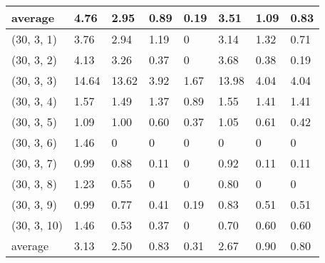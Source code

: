 \begin{appendices}
\begin{table}[H]
\begin{tabular}{  p{1.6cm} | p{0.8cm} | p{1cm} p{1cm} p{1cm} | p{1cm} p{1cm} p{1cm} }
\midrule
average & 4.76  & 2.95 & 0.89  &0.19  &  3.51 & 1.09  & 0.83 \\
\bottomrule
(30, 3, 1) & 3.76  & 2.94  &  1.19 & 0 & 3.14  & 1.32  & 0.71  \\
(30, 3, 2) & 4.13  &  3.26 & 0.37  & 0 &  3.68 & 0.38  & 0.19 \\
(30, 3, 3) &14.64   &  13.62 & 3.92  & 1.67 & 13.98   & 4.04  & 4.04  \\
(30, 3, 4) & 1.57  & 1.49  &  1.37 &0.89  & 1.55  & 1.41  & 1.41 \\
(30, 3, 5) & 1.09  &1.00 &  0.60 & 0.37 &  1.05 & 0.61  & 0.42 \\
(30, 3, 6) & 1.46  &   0& 0  & 0 & 0 &  0 & 0 \\
(30, 3, 7) &  0.99 &  0.88 & 0.11  & 0 & 0.92  & 0.11  & 0.11 \\
(30, 3, 8) & 1.23  &  0.55 & 0  & 0  &  0.80 & 0  & 0  \\
(30, 3, 9) &0.99  &  0.77 & 0.41 & 0.19 &   0.83 & 0.51  & 0.51 \\
(30, 3, 10) &  1.46 & 0.53  & 0.37  & 0 &  0.70 &  0.60 & 0.60 \\
\midrule
average & 3.13  & 2.50 & 0.83  &0.31  &  2.67 & 0.90  & 0.80 \\
\bottomrule
 \end{tabular}
\end{table}



\end{appendices}

%
%






